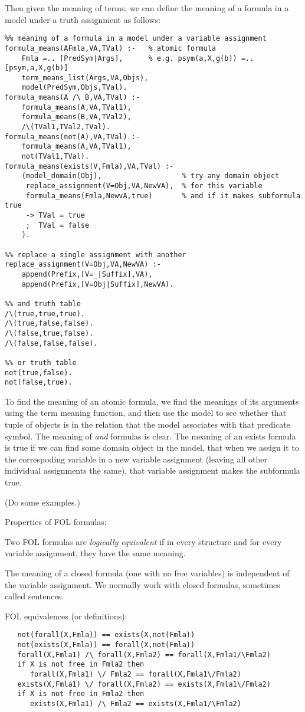 Then given the meaning of terms, we can define the meaning of a
formula in a model under a truth assignment as follows:
\begin{verbatim}
%% meaning of a formula in a model under a variable assignment
formula_means(AFmla,VA,TVal) :-   % atomic formula
    Fmla =.. [PredSym|Args],      % e.g. psym(a,X,g(b)) =.. [psym,a,X,g(b)]
    term_means_list(Args,VA,Objs),
    model(PredSym,Objs,TVal).
formula_means(A /\ B,VA,TVal) :-
    formula_means(A,VA,TVal1),
    formula_means(B,VA,TVal2),
    /\(TVal1,TVal2,TVal).
formula_means(not(A),VA,TVal) :-
    formula_means(A,VA,TVal1),
    not(TVal1,TVal).
formula_means(exists(V,Fmla),VA,TVal) :-
    (model_domain(Obj),                   % try any domain object
     replace_assignment(V=Obj,VA,NewVA),  % for this variable
     formula_means(Fmla,NewvA,true)       % and if it makes subformula true
     ->	TVal = true
     ;  TVal = false
    ).

%% replace a single assignment with another
replace_assignment(V=Obj,VA,NewVA) :-
    append(Prefix,[V=_|Suffix],VA),
    append(Prefix,[V=Obj|Suffix],NewVA).

%% and truth table
/\(true,true,true).
/\(true,false,false).
/\(false,true,false).
/\(false,false,false).

%% or truth table
not(true,false).
not(false,true).
\end{verbatim}
To find the meaning of an atomic formula, we find the meanings of its
arguments using the term meaning function, and then use the model to
see whether that tuple of objects is in the relation that the model
associates with that predicate symbol.  The meaning of {\em and}
formulas is clear.  The meaning of an exists formula is true if we can
find some domain object in the model, that when we assign it to the
correspoding variable in a new variable assignment (leaving all other
individual assignments the same), that variable assignment makes the
subformula true.

(Do some examples.)

Properties of FOL formulas:

Two FOL formulas are {\em logically equivalent} if in every structure
and for every variable assignment, they have the same meaning.

The meaning of a closed formula (one with no free variables) is
independent of the variable assignment.  We normally work with closed
formulas, sometimes called sentences.

FOL equivalences (or definitions):
\begin{verbatim}
   not(forall(X,Fmla)) == exists(X,not(Fmla))
   not(exists(X,Fmla)) == forall(X,not(Fmla))
   forall(X,Fmla1) /\ forall(X,Fmla2) == forall(X,Fmla1/\Fmla2)
   if X is not free in Fmla2 then
      forall(X,Fmla1) \/ Fmla2 == forall(X,Fmla1\/Fmla2)  
   exists(X,Fmla1) \/ forall(X,Fmla2) == exists(X,Fmla1\/Fmla2)
   if X is not free in Fmla2 then
      exists(X,Fmla1) /\ Fmla2 == exists(X,Fmla1/\Fmla2)  
\end{verbatim}

